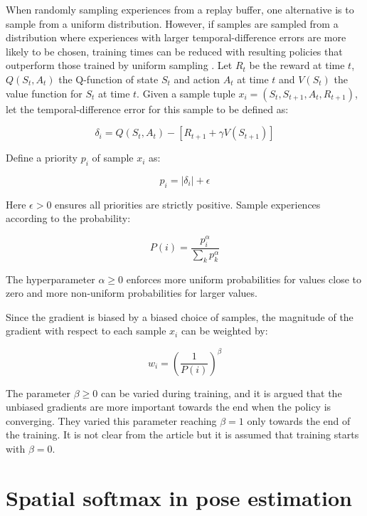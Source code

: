 When randomly sampling experiences from a replay buffer, one alternative is to
sample from a uniform distribution. However, if samples are sampled from a
distribution where experiences with larger temporal-difference errors are more
likely to be chosen, training times can be reduced with resulting policies that
outperform those trained by uniform sampling \cite{schaul2015prioritized}. Let
$R_{t}$ be the reward at time $t$, $Q(S_t, A_t)$ the Q-function of state $S_t$
and action $A_t$ at time $t$ and $V(S_t)$ the value function for $S_t$ at time
$t$. Given a sample tuple $x_i = (S_t, S_{t+1}, A_t, R_{t+1})$, let the
temporal-difference error for this sample to be defined as:

\begin{equation}
    \delta_i = Q(S_{t}, A_t) - \left[ R_{t+1} + \gamma V(S_{t+1}) \right]
\end{equation}

Define a priority $p_i$ of sample $x_i$ as:

\begin{equation}
    p_i = |\delta_i| + \epsilon
\end{equation}

Here $\epsilon > 0$ ensures all priorities are strictly positive. Sample experiences
according to the probability:

\begin{equation}
    P(i) = \frac{p_i^\alpha}{\sum_k p_k^\alpha}
\end{equation}

The hyperparameter $\alpha \geq 0$ enforces more uniform probabilities for values close to
zero and more non-uniform probabilities for larger values.

Since the gradient is biased by a biased choice of samples, the magnitude of
the gradient with respect to each sample $x_i$ can be weighted by:

\begin{equation}
    w_i = \left( \frac{1}{P(i)} \right)^\beta
\end{equation}

The parameter $\beta \geq 0$ can be varied during training, and it is argued that
the unbiased gradients are more important towards the end when the policy is
converging. They varied this parameter reaching $\beta = 1$ only towards the
end of the training. It is not clear from the article but it is assumed that
training starts with $\beta = 0$.

\section{Spatial softmax in pose estimation}

